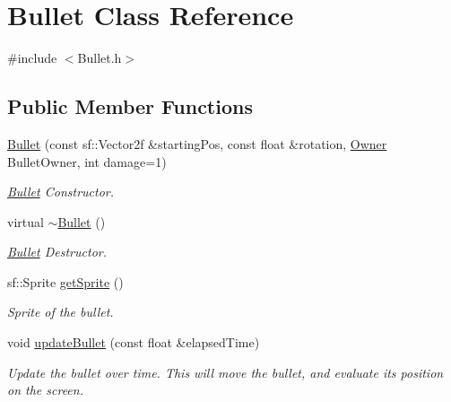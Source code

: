 \hypertarget{class_bullet}{}\section{Bullet Class Reference}
\label{class_bullet}


{\ttfamily \#include $<$Bullet.\+h$>$}

\subsection*{Public Member Functions}
\begin{DoxyCompactItemize}
\item 
\hyperlink{class_bullet_a751da85d043013c509426b6cf33bd9c5}{Bullet} (const sf\+::\+Vector2f \&starting\+Pos, const float \&rotation, \hyperlink{_bullet_8h_a3b5e9e55eb7b08d5702a101e529e5507}{Owner} Bullet\+Owner, int damage=1)
\begin{DoxyCompactList}\small\item\em \hyperlink{class_bullet}{Bullet} Constructor. \end{DoxyCompactList}\item 
\mbox{\label{class_bullet_aaeb5cb41d7db89f49007b08b41f1bfcf}} 
virtual \hyperlink{class_bullet_aaeb5cb41d7db89f49007b08b41f1bfcf}{$\sim$\+Bullet} ()
\begin{DoxyCompactList}\small\item\em \hyperlink{class_bullet}{Bullet} Destructor. \end{DoxyCompactList}\item 
\mbox{\label{class_bullet_aa313bc0e2c9fd200c526cb6fe320462c}} 
sf\+::\+Sprite \hyperlink{class_bullet_aa313bc0e2c9fd200c526cb6fe320462c}{get\+Sprite} ()
\begin{DoxyCompactList}\small\item\em Sprite of the bullet. \end{DoxyCompactList}\item 
void \hyperlink{class_bullet_a241c1ceb808ae0f93e4f66f28bbd525f}{update\+Bullet} (const float \&elapsed\+Time)
\begin{DoxyCompactList}\small\item\em Update the bullet over time. This will move the bullet, and evaluate its position on the screen. \end{DoxyCompactList}\item 
\mbox{\label{class_bullet_a103ff9146dce215f15ca0c4282a5a8cf}} 

\end{DoxyCompactItemize}
